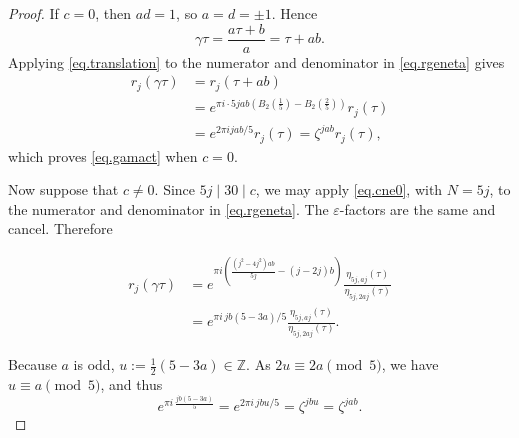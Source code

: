 \documentclass[10pt,a4paper]{amsart}
\begin{document}
\begin{proof}
If $c=0$, then $ad=1$, so $a=d=\pm1$.  Hence
\begin{equation*}
\gamma\tau=\frac{a\tau+b}{a}=\tau+ab.
\end{equation*}
Applying \eqref{eq.translation} to the
numerator and denominator in \eqref{eq.rgeneta} gives
\begin{equation*}
\begin{aligned}
r_{j}(\gamma\tau)
&=r_{j}(\tau+ab)\\
&=e^{\pi i\cdot5jab
\left(B_{2}(\frac15)-B_{2}(\frac25)\right)}r_{j}(\tau)\\
&=e^{2\pi ijab/5}r_{j}(\tau)
=\zeta^{jab}r_{j}(\tau),
\end{aligned}
\end{equation*}
which proves \eqref{eq.gamact} when $c=0$.

Now suppose that $c\ne0$. 
Since $5j\mid30\mid c$,  we may apply \eqref{eq.cne0}, with  $N=5j$, to the
numerator and denominator in \eqref{eq.rgeneta}.  The
$\varepsilon$-factors are the same and cancel.  Therefore

\begin{equation}\label{eq.transformraw}
\begin{aligned}
r_{j}(\gamma\tau)
&=
e^{\pi i\left(
\frac{(j^{2}-4j^{2})ab}{5j}-(j-2j)b
\right)}
\frac{\eta_{5j,aj}(\tau)}
{\eta_{5j,2aj}(\tau)}\\
&=
e^{\pi i\,jb(5-3a)/5}
\frac{\eta_{5j,aj}(\tau)}
{\eta_{5j,2aj}(\tau)}.
\end{aligned}
\end{equation}

Because $a$ is odd, $u:=\tfrac12(5-3a)\in\mathbb{Z}$.  As
$2u\equiv2a\pmod5$, we have $u\equiv a\pmod5$, and thus
\begin{equation}
e^{\pi i\,\frac{jb(5-3a)}{5}}=e^{2\pi i\,jbu/5}=\zeta^{jbu}=\zeta^{jab}.
\label{eq.expuniform}
\end{equation}


\end{proof}
\end{document}
